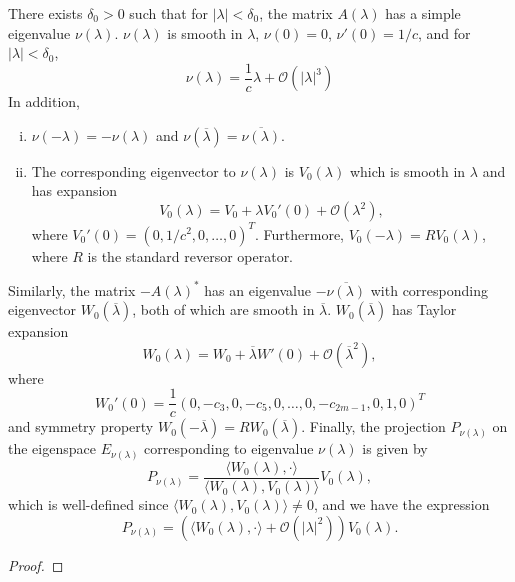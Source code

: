 \documentclass[thesis.tex]{subfiles}
\begin{document}
\begin{lemma}\label{nulambdalemma}
There exists $\delta_0 > 0$ such that for $|\lambda| < \delta_0$, the matrix $A(\lambda)$ has a simple eigenvalue $\nu(\lambda)$. $\nu(\lambda)$ is smooth in $\lambda$, $\nu(0) = 0$, $\nu'(0) = 1/c$, and for $|\lambda| < \delta_0$,
\begin{equation}\label{nulambda}
\nu(\lambda) = \frac{1}{c} \lambda + \mathcal{O}(|\lambda|^3)
\end{equation}
In addition,
\begin{enumerate}[(i)]
\item $\nu(-\lambda) = -\nu(\lambda)$ and $\nu(\overline{\lambda}) = \overline{\nu(\lambda)}$.
\item The corresponding eigenvector to $\nu(\lambda)$ is $V_0(\lambda)$ which is smooth in $\lambda$ and has expansion
\begin{equation}\label{V0expansion}
V_0(\lambda) = V_0 + \lambda V_0'(0) + \mathcal{O}(\lambda^2),
\end{equation}
where $V_0'(0) = (0, 1/c^2, 0, \dots, 0)^T$. Furthermore, $V_0(-\lambda) = R V_0(\lambda)$, where $R$ is the standard reversor operator.
\end{enumerate}

Similarly, the matrix $-A(\lambda)^*$ has an eigenvalue $-\overline{\nu(\lambda)}$ with corresponding eigenvector $W_0(\overline{\lambda})$, both of which are smooth in $\overline{\lambda}$. $W_0(\overline{\lambda})$ has Taylor expansion
\begin{equation}\label{W0expansion}
W_0(\lambda) = W_0 + \overline{\lambda} W'(0) + \mathcal{O}(\overline{\lambda}^2),
\end{equation}
where 
\begin{equation}\label{W0prime}
W_0'(0) = \frac{1}{c} \left( 0, -c_3, 0, -c_5, 0, \dots, 0, -c_{2m-1}, 0, 1, 0\right)^T
\end{equation}
and symmetry property $W_0(-\overline{\lambda}) = R W_0(\overline{\lambda})$. Finally, the projection $P_{\nu(\lambda)}$ on the eigenspace $E_{\nu(\lambda)}$ corresponding to eigenvalue $\nu(\lambda)$ is given by
\begin{equation}\label{Pnulambda}
P_{\nu(\lambda)} = \frac{ \langle W_0(\lambda), \cdot \rangle }{\langle W_0(\lambda), V_0(\lambda) \rangle } V_0(\lambda),
\end{equation}
which is well-defined since $\langle W_0(\lambda), V_0(\lambda) \rangle \neq 0$, and we have the expression
\begin{equation}\label{Pnulambda1}
P_{\nu(\lambda)} = \left( \langle W_0(\lambda), \cdot \rangle + \mathcal{O}(|\lambda|^2) \right)  V_0(\lambda).
\end{equation}
\begin{proof}


\end{proof}
\end{lemma}
\end{document}
